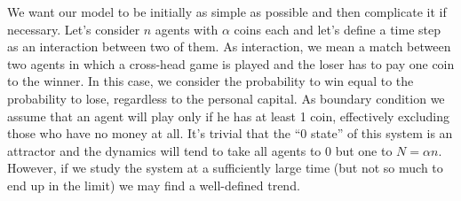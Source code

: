 We want our model to be initially as simple as possible and then complicate it if necessary.
Let's consider $n$ agents with $\alpha$ coins each and let's define a time step as an interaction between two of them.
As interaction, we mean a match between two agents in which a cross-head game is played and the loser has to pay one coin to the winner.
In this case, we consider the probability to win equal to the probability to lose, regardless to the personal capital.
As boundary condition we assume that an agent will play only if he has at least 1 coin, effectively excluding those who have no money at all.
It's trivial that the ``0 state'' of this system is an attractor and the dynamics will tend to take all agents to 0 but one to $N = \alpha n$.
However, if we study the system at a sufficiently large time (but not so much to end up in the limit) we may find a well-defined trend.

